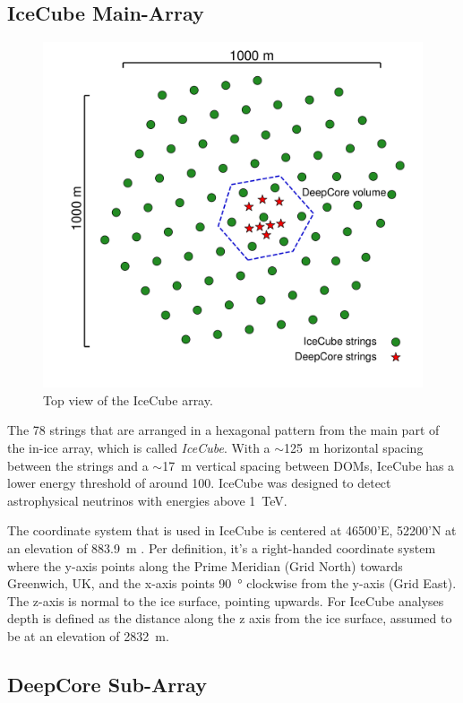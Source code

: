 \subsection{IceCube Main-Array} 

\begin{figure}
    \includegraphics[trim={2.0cm, 1.5cm, 0, 0}, clip, width=0.65\linewidth]{figures/icecube_deepcore/icecube_top_view_bw.pdf}
    \caption[IceCube top view]{Top view of the IceCube array.}
\end{figure}

The 78 strings that are arranged in a hexagonal pattern from the main part of the in-ice array, which is called \textit{IceCube}. With a $\sim$\SI{125}{\meter} horizontal spacing between the strings and a $\sim$\SI{17}{\meter} vertical spacing between DOMs, IceCube has a lower energy threshold of around \SI{100}{\gev}. IceCube was designed to detect astrophysical neutrinos with energies above \SI{1}{\tera\electronvolt}.

The coordinate system that is used in IceCube is centered at 46500'E, 52200'N at an elevation of \SI{883.9}{\meter} . Per definition, it's a right-handed coordinate system where the y-axis points along the Prime Meridian (Grid North) towards Greenwich, UK, and the x-axis points \SI{90}{\degree} clockwise from the y-axis (Grid East). The z-axis is normal to the ice surface, pointing upwards. For IceCube analyses depth is defined as the distance along the z axis from the ice surface, assumed to be at an elevation of \SI{2832}{\meter}.


\subsection{DeepCore Sub-Array} 

